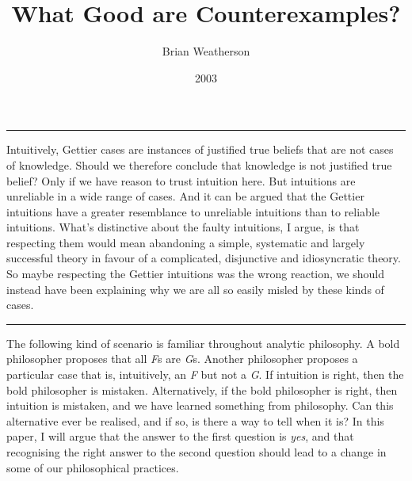 \documentclass[
  10pt,
  letterpaper,
  DIV=11,
  numbers=noendperiod,
  twoside]{scrartcl}
\title{What Good are Counterexamples?}
\author{Brian Weatherson}
\date{2003}
\renewenvironment{abstract}
 {\vspace{-1.25cm}
 \quotation\small\noindent\rule{\linewidth}{.5pt}\par\smallskip
 \noindent }
 {\par\noindent\rule{\linewidth}{.5pt}\endquotation}
\begin{document}
\maketitle
\begin{abstract}
Intuitively, Gettier cases are instances of justified true beliefs that
are not cases of knowledge. Should we therefore conclude that knowledge
is not justified true belief? Only if we have reason to trust intuition
here. But intuitions are unreliable in a wide range of cases. And it can
be argued that the Gettier intuitions have a greater resemblance to
unreliable intuitions than to reliable intuitions. What's distinctive
about the faulty intuitions, I argue, is that respecting them would mean
abandoning a simple, systematic and largely successful theory in favour
of a complicated, disjunctive and idiosyncratic theory. So maybe
respecting the Gettier intuitions was the wrong reaction, we should
instead have been explaining why we are all so easily misled by these
kinds of cases.
\end{abstract}

The following kind of scenario is familiar throughout analytic
philosophy. A bold philosopher proposes that all \emph{F}s are
\emph{G}s. Another philosopher proposes a particular case that is,
intuitively, an \emph{F} but not a \emph{G}. If intuition is right, then
the bold philosopher is mistaken. Alternatively, if the bold philosopher
is right, then intuition is mistaken, and we have learned something from
philosophy. Can this alternative ever be realised, and if so, is there a
way to tell when it is? In this paper, I will argue that the answer to
the first question is \emph{yes}, and that recognising the right answer
to the second question should lead to a change in some of our
philosophical practices.
\end{document}
